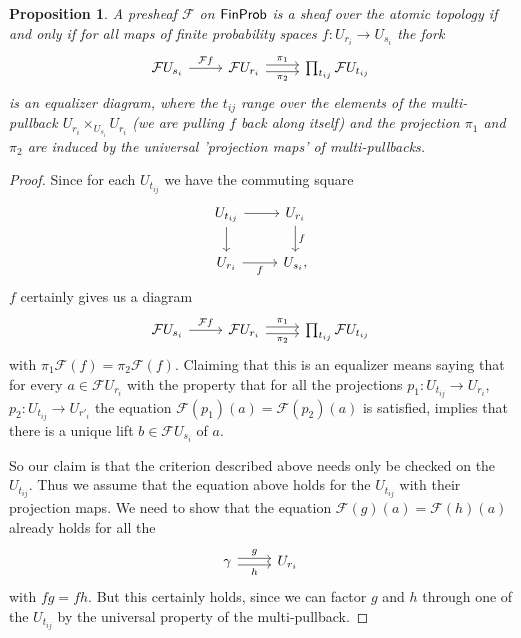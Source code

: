 \documentclass[a4paper]{amsproc}
\theoremstyle{plain}
\newtheorem{proposition}[theorem]{Proposition}
\theoremstyle{definition}
\theoremstyle{remark}
\numberwithin{equation}{section}
\newcommand{\FinProb}{\textup{\textsf{FinProb}}}
\begin{document}
\begin{proposition} \label{sheaf_condition}
A presheaf $\mathcal{F}$ on $\FinProb$ is a sheaf over the atomic topology if and only if for all maps of finite probability spaces $f: U_{r_i} \to U_{s_i}$ the fork
\[
\begin{tikzcd}
\mathcal{F} U_{s_i} \arrow[r, "\mathcal{F}f"] &
\mathcal{F} U_{r_i} \arrow[r, "\pi_1", shift left] \arrow[r, "\pi_2"', shift right] & \prod_{t_{ij}} \mathcal{F} U_{t_{ij}}
\end{tikzcd}
\]
is an equalizer diagram, where the $t_{ij}$ range over the elements of the multi-pullback $U_{r_i} \times_{U_{s_i}} U_{r_i}$ (we are pulling $f$ back along itself) and the projection $\pi_1$ and $\pi_2$ are induced by the universal 'projection maps' of multi-pullbacks.
\end{proposition}
\begin{proof}
Since for each $U_{t_{ij}}$ we have the commuting square
\[
\begin{tikzcd}
U_{t_{ij}} \arrow[r] \arrow[d] & {U_{r_i}} \arrow[d, "f"] \\
{U_{r_i}} \arrow[r, "f"']            & {U_{s_i}} ,
\end{tikzcd}
\]
$f$ certainly gives us a diagram
\[
\begin{tikzcd}
\mathcal{F} U_{s_i} \arrow[r, "\mathcal{F}f"] & \mathcal{F} U_{r_i} \arrow[r, "\pi_1", shift left] \arrow[r, "\pi_2"', shift right] & \prod_{t_{ij}} \mathcal{F} U_{t_{ij}}
\end{tikzcd}
\]
with $\pi_1 \mathcal{F}(f) = \pi_2 \mathcal{F}(f)$. Claiming that this is an equalizer means saying that for every $a \in \mathcal{F}U_{r_i}$ with the property that for all the projections $p_1: U_{t_{ij}} \to U_{r_i}$, $p_2: U_{t_{ij}} \to U_{r'_i}$ the equation $\mathcal{F}(p_1)(a) = \mathcal{F}(p_2)(a)$ is satisfied, implies that there is a unique lift $b \in \mathcal{F}U_{s_i}$ of $a$.

So our claim is that the criterion described above needs only be checked on the $U_{t_{ij}}$. Thus we assume that the equation above holds for the $U_{t_{ij}}$ with their projection maps. We need to show that the equation $\mathcal{F}(g)(a) = \mathcal{F}(h)(a)$ already holds for all the \[
\begin{tikzcd}
\gamma \arrow[r, "g", shift left] \arrow[r, "h"', shift right] & U_{r_i}
\end{tikzcd}
\]
with $fg = fh$. But this certainly holds, since we can factor $g$ and $h$ through one of the $U_{t_{ij}}$ by the universal property of the multi-pullback.
\end{proof}
\end{document}
